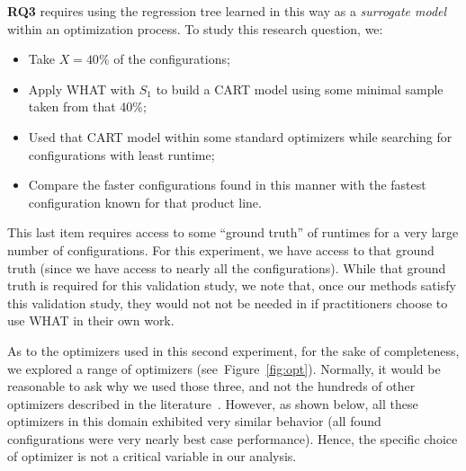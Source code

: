 \documentclass{sig-alternative}
\newcommand{\bi}{\begin{itemize}}%
\newcommand{\ei}{\end{itemize}}
\newcommand{\fig}[1]{Figure~\ref{fig:#1}}
\begin{document}
{\bf RQ3} requires using the regression tree learned in this way as a {\em surrogate model} within an optimization process. To study this research question, we:
\bi
\item Take   $X=40\%$ of the configurations;
\item Apply WHAT with $S_1$ to build a CART model using some minimal sample taken from that 40\%;
\item Used that CART model within some standard optimizers while searching for 
configurations with least runtime;
\item  Compare the faster configurations found in this manner with the fastest configuration
known for that product line.
\ei
This last item requires access to some ``ground truth'' of runtimes for a very
large number of configurations. For this experiment, we have access to that ground truth
(since we have access to nearly all the configurations). While that ground truth is required for this
validation study, we note that, once our methods satisfy this validation study,
they would not not be needed in if practitioners choose to use WHAT in their own work.

As to the optimizers used in this second experiment, for the sake of completeness, we explored
a range of optimizers (see~\fig{opt}).  Normally,
it would be  reasonable to ask
why we used those three, and not the hundreds of other 
optimizers described in the literature~\cite{fletcher13,harman12}. However,
as shown below, all these optimizers in this
domain exhibited  very similar
behavior (all found configurations were very nearly
best case performance). Hence, the specific
choice of optimizer is not a critical
variable in  our analysis.
\end{document}
